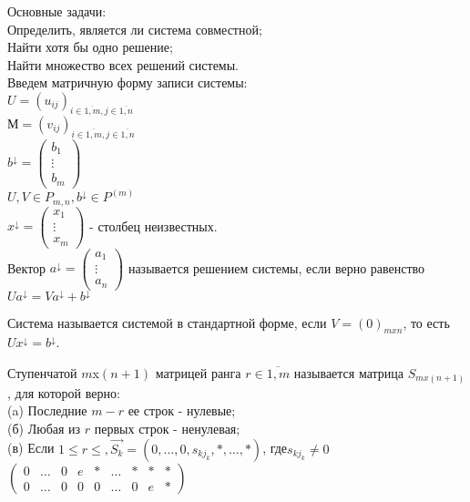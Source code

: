 Основные задачи: \\
  Определить, является ли система совместной; \\
  Найти хотя бы одно решение; \\
  Найти множество всех решений системы. \\

Введем матричную форму записи системы: \\
$U = (u_{ij})_{i \in \overline{1, m}, j \in \overline{1, n}}$ \\
$М = (v_{ij})_{i \in \overline{1, m}, j \in \overline{1, n}}$ \\
$b^\downarrow = \begin{pmatrix} b_1 \\ \vdots \\ b_m \end{pmatrix}$ \\
$U, V \in P_{m,n}, b^\downarrow \in P^{(m)}$ \\
$x^\downarrow = \begin{pmatrix} x_1 \\ \vdots \\ x_m \end{pmatrix}$ - столбец неизвестных. \\

Вектор $a^\downarrow = \begin{pmatrix}a_1 \\ \vdots \\ a_n \end{pmatrix}$ называется
решением системы, если верно равенство $Ua^\downarrow = Va^\downarrow + b^\downarrow$

\begin{defs}
  Система называется системой в стандартной форме, если $V = (0)_{mxn}$, то есть $Ux^\downarrow = b^\downarrow$.
\end{defs}

Ступенчатой $m$x$(n+1)$ матрицей ранга $r \in \overline{1, m}$ называется
матрица $S_{mx(n+1)}$, для которой верно: \\
(a) Последние $m-r$ ее строк - нулевые; \\
(б) Любая из $r$ первых строк - ненулевая; \\
(в) Если $1 \leqslant r \leqslant, \overrightarrow{S_k} = (0, \ldots, 0, s_{kj_k}, *, \ldots, *)$, где$s_{kj_k} \neq 0$\\
$\begin{pmatrix}
    0 & \ldots & 0 & e & * & \ldots & * & * & * \\
    0 & \ldots & 0 & 0 & 0 & \ldots & 0 & e & *
\end{pmatrix}$
\newpage
